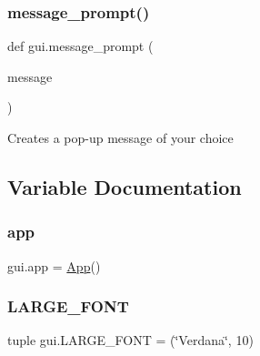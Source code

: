 \subsubsection{\texorpdfstring{message\_prompt()}{message\_prompt()}}
{\footnotesize\ttfamily def gui.\+message\+\_\+prompt (\begin{DoxyParamCaption}\item[{}]{message }\end{DoxyParamCaption})}

\begin{DoxyVerb}Creates a pop-up message of your choice\end{DoxyVerb}
 

\subsection{Variable Documentation}
\mbox{\label{namespacegui_af263120175dda5fb802cbe5ce9490b93}} 
\subsubsection{\texorpdfstring{app}{app}}
{\footnotesize\ttfamily gui.\+app = \mbox{\hyperlink{classgui_1_1_app}{App}}()}

\mbox{\label{namespacegui_ac177936c9562254841e5e7f5fa210fb1}} 
\subsubsection{\texorpdfstring{LARGE\_FONT}{LARGE\_FONT}}
{\footnotesize\ttfamily tuple gui.\+L\+A\+R\+G\+E\+\_\+\+F\+O\+NT = (\char`\"{}Verdana\char`\"{}, 10)}


